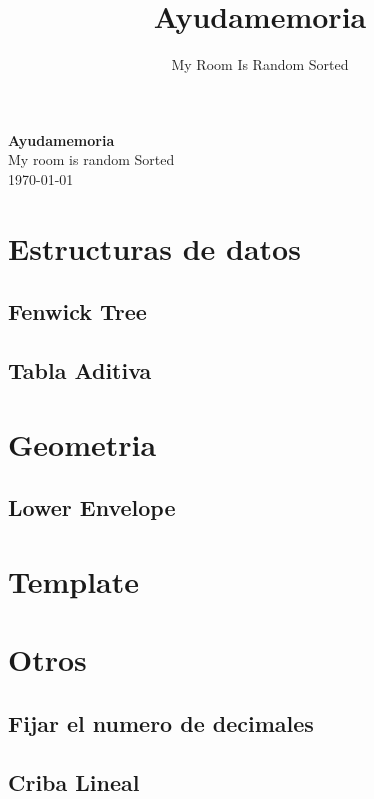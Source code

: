 \documentclass[a4paper,11pt,landscape,twocolumn]{article}
\title{Ayudamemoria}
\author{My Room Is Random Sorted}
\begin{document}
\begin{center}
    \LARGE\textbf{Ayudamemoria}\\[1em]
    \large My room is random Sorted\\[1em]
    \normalsize \today\\[1em]
\end{center}

\tableofcontents

\section{Estructuras de datos}

\subsection{Fenwick Tree}



\subsection{Tabla Aditiva}



\section{Geometria}



\subsection{Lower Envelope}



\section{Template}



\section{Otros}

\subsection{Fijar el numero de decimales}



\subsection{Criba Lineal}


\end{document}
